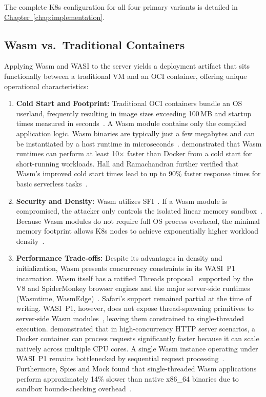 \noindent The complete \acs{K8s} configuration for all four primary variants is detailed in \hyperref[chap:implementation]{Chapter~\ref{chap:implementation}}.

\subsection{Wasm vs.\ Traditional Containers}
Applying \acs{Wasm} and \acs{WASI} to the server yields a deployment artifact that sits functionally between a traditional \ac{VM} and an \acs{OCI} container, offering unique operational characteristics:

\begin{enumerate}
    \item \textbf{Cold Start and Footprint:} Traditional \acs{OCI} containers bundle an \acs{OS} userland, frequently resulting in image sizes exceeding 100\,MB and startup times measured in seconds~\cite{long2023wasm, wiegratz2024k8swasm}. A \acs{Wasm} module contains only the compiled application logic. \acs{Wasm} binaries are typically just a few megabytes and can be instantiated by a host runtime in microseconds~\cite{long2023wasm}. \textcite{long2023wasm} demonstrated that \acs{Wasm} runtimes can perform at least 10$\times$ faster than Docker from a cold start for short-running workloads. Hall and Ramachandran further verified that \acs{Wasm}'s improved cold start times lead to up to 90\% faster response times for basic serverless tasks~\cite{hall2021serverless}.
    \item \textbf{Security and Density:} \acs{Wasm} utilizes \acs{SFI}~\cite{wahbe1993sfi, haas2017bringing}. If a \acs{Wasm} module is compromised, the attacker only controls the isolated linear memory sandbox~\cite{lehmann2020everythingold}. Because \acs{Wasm} modules do not require full \acs{OS} process overhead, the minimal memory footprint allows \acs{K8s} nodes to achieve exponentially higher workload density~\cite{long2023wasm, jansen2025memwasm}.
    \item \textbf{Performance Trade-offs:} Despite its advantages in density and initialization, \acs{Wasm} presents concurrency constraints in its \acs{WASI}~P1 incarnation. \acs{Wasm} itself has a ratified Threads proposal~\cite{wasmthreadsproposal} supported by the V8 and SpiderMonkey browser engines and the major server-side runtimes (Wasmtime, WasmEdge)~\cite{wasmthreadsproposal}. Safari's support remained partial at the time of writing. \acs{WASI}~P1, however, does not expose thread-spawning primitives to server-side \acs{Wasm} modules~\cite{clark2019standardizing, sondell2024performance}, leaving them constrained to single-threaded execution. \textcite{sondell2024performance} demonstrated that in high-concurrency \acs{HTTP} server scenarios, a Docker container can process requests significantly faster because it can scale natively across multiple \acs{CPU} cores. A single \acs{Wasm} instance operating under \acs{WASI}~P1 remains bottlenecked by sequential request processing~\cite{sondell2024performance, clark2019standardizing}. Furthermore, Spies and Mock found that single-threaded \acs{Wasm} applications perform approximately 14\% slower than native x86\_64 binaries due to sandbox bounds-checking overhead~\cite{spies2021evaluation}.

\end{enumerate}
